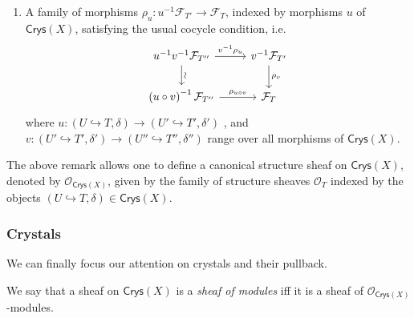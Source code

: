 \begin{rem}
\begin{enumerate}
		\item A family of morphisms $\rho_u\colon u^{-1}\mathcal{F}_{T'} \to \mathcal{F}_T$,
			indexed by morphisms 
			$u$ of $\mathsf{Crys}(X)$,
			satisfying the usual cocycle condition, i.e.
			\begin{equation*}
			\begin{tikzcd}
				u^{-1} v^{-1} \mathcal{F}_{T''} 
				\arrow[r, "v^{-1}\rho_u", rightarrow] 
				\arrow[d, "\rotatebox{90}{\(\sim\)}", rightarrow] &
				v^{-1} \mathcal{F}_{T'} 
				\arrow[d, "\rho_v", rightarrow] \\
				\left( u \circ v \right)^{-1} \mathcal{F}_{T''}
				\arrow[r, "\rho_{u \circ v}", rightarrow] &
				\mathcal{F}_T
			\end{tikzcd}
			\end{equation*}
			where $u\colon \left(U \hookrightarrow T, \delta\right) \to 
			\left(U' \hookrightarrow T', \delta'\right)$ ,
			and $v\colon \left(U' \hookrightarrow T', \delta'\right) \to 
			\left(U'' \hookrightarrow T'', \delta''\right)$
			range over all morphisms of $\mathsf{Crys}(X)$.
	\end{enumerate}
\end{rem}


\begin{ex}
	The above remark allows one to define a canonical structure sheaf
	on $\mathsf{Crys}(X)$, denoted by $\mathcal{O}_{\mathsf{Crys}(X)}$,
	given by the family of structure sheaves $\mathcal{O}_T$
	indexed by the objects 
	$\left(U \hookrightarrow T, \delta\right) \in \mathsf{Crys}(X)$.
\end{ex}



\subsubsection{Crystals}
We can finally focus our attention on crystals and their pullback.


\begin{defn}
	We say that a sheaf on $\mathsf{Crys}(X)$ is a \emph{sheaf of modules}
	iff it is a sheaf of $\mathcal{O}_{\mathsf{Crys}(X)}$-modules.
\end{defn}


